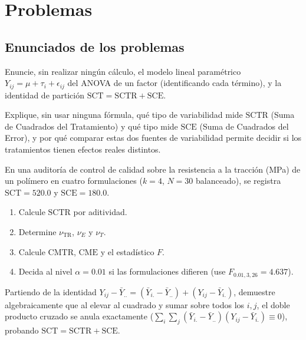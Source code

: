 \section*{Problemas}

\subsection*{Enunciados de los problemas}

\begin{problema}
	\label{prob:04f6e1c}
	Enuncie, sin realizar ningún cálculo, el modelo lineal paramétrico $Y_{ij}=\mu+\tau_i+\epsilon_{ij}$ del ANOVA de un factor (identificando cada término), y la identidad de partición $\text{SCT}=\text{SCTR}+\text{SCE}$.
\end{problema}

\begin{problema}
	\label{prob:e3fdc51}
	Explique, sin usar ninguna fórmula, qué tipo de variabilidad mide $\text{SCTR}$ (Suma de Cuadrados del Tratamiento) y qué tipo mide $\text{SCE}$ (Suma de Cuadrados del Error), y por qué comparar estas dos fuentes de variabilidad permite decidir si los tratamientos tienen efectos reales distintos.
\end{problema}

\begin{problema}
	\label{prob:2b1379c}
	En una auditoría de control de calidad sobre la resistencia a la tracción (MPa) de un polímero en cuatro formulaciones ($k=4$, $N=30$ balanceado), se registra $\text{SCT}=520.0$ y $\text{SCE}=180.0$.
	\begin{enumerate}
		\item Calcule $\text{SCTR}$ por aditividad.
		\item Determine $\nu_{\text{TR}}$, $\nu_E$ y $\nu_T$.
		\item Calcule $\text{CMTR}$, $\text{CME}$ y el estadístico $F$.
		\item Decida al nivel $\alpha=0.01$ si las formulaciones difieren (use $F_{0.01,3,26}=4.637$).
	\end{enumerate}
\end{problema}

\begin{problema}
	\label{prob:614e799}
	Partiendo de la identidad $Y_{ij}-\bar Y_{..} = (\bar Y_{i.}-\bar Y_{..})+(Y_{ij}-\bar Y_{i.})$, demuestre algebraicamente que al elevar al cuadrado y sumar sobre todos los $i,j$, el doble producto cruzado se anula exactamente ($\sum_i\sum_j(\bar Y_{i.}-\bar Y_{..})(Y_{ij}-\bar Y_{i.})\equiv0$), probando $\text{SCT}=\text{SCTR}+\text{SCE}$.
\end{problema}

